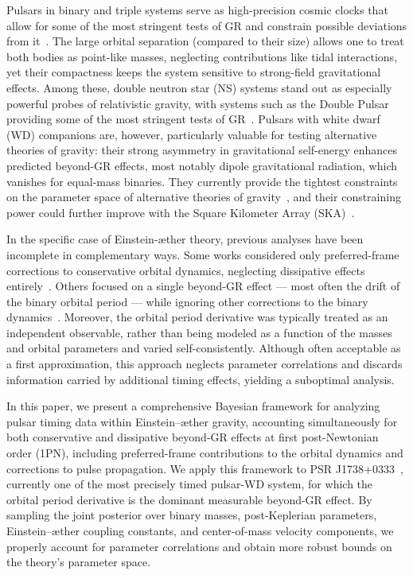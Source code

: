 \documentclass[
    floats,
    floatfix,
    amssymb,
    prd,
    twocolumn,
    superscriptaddress,
    nofootinbib,
    unicode,
    colorlinks=true,
    linktocpage=true
]{revtex4-2}
\begin{document}
Pulsars in binary and triple systems serve as high-precision cosmic clocks that allow for some of the most stringent tests of GR and constrain possible deviations from it~\cite{Carleo:kiselev,Carleo:non_local,Freire:2024, Freire:2024, ben2023tests}. The large orbital separation (compared to their size) allows one to treat both bodies as point-like masses, neglecting contributions like tidal interactions, yet their compactness keeps the system sensitive to strong-field gravitational effects. Among these, double neutron star (NS) systems stand out as especially powerful probes of relativistic gravity, with systems such as the Double Pulsar providing some of the most stringent tests of GR~\cite{Kramer:2004hd, Hu_2022}. Pulsars with white dwarf (WD) companions are, however, particularly valuable for testing alternative theories of gravity: their strong asymmetry in gravitational self-energy enhances predicted beyond-GR effects, most notably dipole gravitational radiation, which vanishes for equal-mass binaries. They currently provide the tightest constraints on the parameter space of alternative theories of gravity~\cite{Freire:2024,Hu:2025nua}, and their constraining power could further improve with the Square Kilometer Array (SKA)~\cite{SKA_Vivek}. 

In the specific case of Einstein-\ae ther theory, previous analyses have been incomplete in complementary ways. Some works considered only preferred-frame corrections to conservative orbital dynamics, neglecting dissipative effects entirely~\cite{Bell_1996,Shao_2013}. Others focused on a single beyond-GR effect — most often the drift of the binary orbital period — while ignoring other corrections to the binary dynamics~\cite{Yagi:2013qpa,Yagi_2014,Gupta_2021}. Moreover, the orbital period derivative was typically treated as an independent observable, rather than being modeled as a function of the masses and orbital parameters and varied self-consistently. Although often acceptable as a first approximation, this approach neglects parameter correlations and discards information carried by additional timing effects, yielding a suboptimal analysis.

In this paper, we present a comprehensive Bayesian framework for analyzing pulsar timing data within Einstein--\ae ther gravity, accounting simultaneously for both conservative and dissipative beyond-GR effects at first post-Newtonian order (1PN), including preferred-frame contributions to the orbital dynamics and corrections to pulse propagation. We apply this framework to PSR J1738+0333~\cite{Freire:2007sb}, currently one of the most precisely timed pulsar-WD system, for which the orbital period derivative is the dominant measurable beyond-GR effect. By sampling the joint posterior over binary masses, post-Keplerian parameters, Einstein--\ae ther coupling constants, and center-of-mass velocity components, we properly account for parameter correlations and obtain more robust bounds on the theory's parameter space. 
\end{document}
